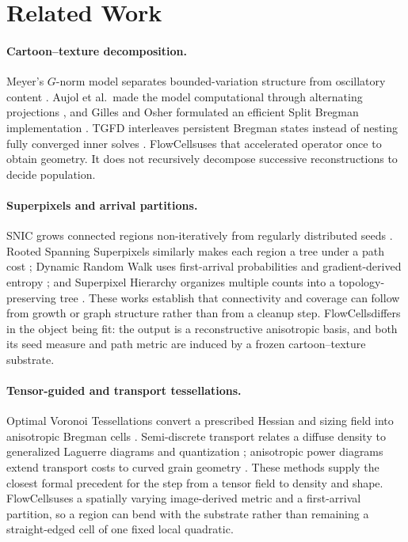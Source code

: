 \documentclass[11pt,letterpaper]{article}
\newcommand{\method}{FlowCells}
\begin{document}
\section{Related Work}
\label{sec:related}

\paragraph{Cartoon--texture decomposition.}
Meyer's \(G\)-norm model separates bounded-variation structure from oscillatory
content \citep{meyer2001oscillating}. Aujol et al.\ made the model computational through
alternating projections \citep{aujol2005decomposition,chambolle2004algorithm}, and
Gilles and Osher formulated an efficient Split Bregman implementation
\citep{goldstein2009split,gilles2024bregman}. TGFD interleaves persistent Bregman states
instead of nesting fully converged inner solves \citep{rainstar2026tgfd}. \method uses
that accelerated operator once to obtain geometry. It does not recursively decompose
successive reconstructions to decide population.

\paragraph{Superpixels and arrival partitions.}
SNIC grows connected regions non-iteratively from regularly distributed seeds
\citep{achanta2017snic}. Rooted Spanning Superpixels similarly makes each region a tree
under a path cost \citep{chai2020rss}; Dynamic Random Walk uses first-arrival
probabilities and gradient-derived entropy \citep{kang2020drw}; and Superpixel Hierarchy
organizes multiple counts into a topology-preserving tree \citep{wei2018hierarchy}.
These works establish that connectivity and coverage can follow from growth or graph
structure rather than from a cleanup step. \method differs in the object being fit:
the output is a reconstructive anisotropic basis, and both its seed measure and path
metric are induced by a frozen cartoon--texture substrate.

\paragraph{Tensor-guided and transport tessellations.}
Optimal Voronoi Tessellations convert a prescribed Hessian and sizing field into
anisotropic Bregman cells \citep{budninskiy2016ovt}. Semi-discrete transport relates a
diffuse density to generalized Laguerre diagrams and quantization
\citep{bourne2025unbalanced}; anisotropic power diagrams extend transport costs to
curved grain geometry \citep{buze2024anisotropic}. These methods supply the closest
formal precedent for the step from a tensor field to density and shape. \method uses a
spatially varying image-derived metric and a first-arrival partition, so a region can
bend with the substrate rather than remaining a straight-edged cell of one fixed local
quadratic.
\end{document}
